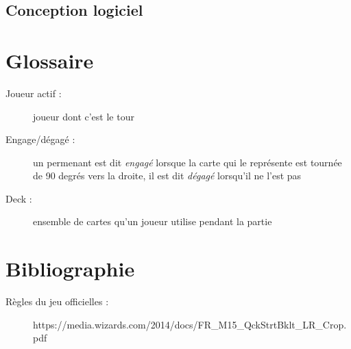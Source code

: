 \documentclass[a4paper,12pt]{article}
\begin{document}
\clearpage
\subsection{Conception logiciel}


%

\section{Glossaire}

\begin{description}
\item[Joueur actif :] joueur dont c'est le tour
\item[Engage/dégagé :] un permenant est dit \emph{engagé} lorsque la carte qui le représente est tournée de 90 degrés vers la droite, il est dit \emph{dégagé} lorsqu'il ne l'est pas
\item[Deck :] ensemble de cartes qu'un joueur utilise pendant la partie
\end{description}


\section{Bibliographie}

\begin{description}
\item[Règles du jeu officielles :] https://media.wizards.com/2014/docs/FR\_M15\_QckStrtBklt\_LR\_Crop.pdf

\end{description}
\end{document}
